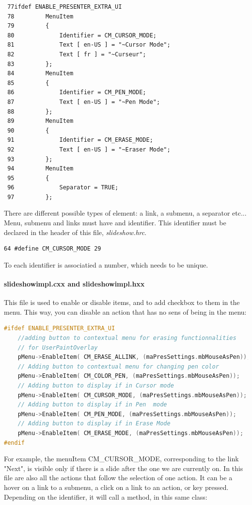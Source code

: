 \documentclass[a4paper,11pt]{article}
\begin{document}
\begin{verbatim}
 77ifdef ENABLE_PRESENTER_EXTRA_UI
 78         MenuItem
 79         {
 80             Identifier = CM_CURSOR_MODE;
 81             Text [ en-US ] = "~Cursor Mode";
 82             Text [ fr ] = "~Curseur";
 83         };
 84         MenuItem
 85         {
 86             Identifier = CM_PEN_MODE;
 87             Text [ en-US ] = "~Pen Mode";
 88         };
 89         MenuItem
 90         {
 91             Identifier = CM_ERASE_MODE;
 92             Text [ en-US ] = "~Eraser Mode";
 93         };
 94         MenuItem
 95         {
 96             Separator = TRUE;
 97         };
\end{verbatim}

    There are different possible types of element: a link, a submenu, a
separator etc... Menu, submenu and links must have and identifier. This
identifier must be declared in the header of this file, \emph{slideshow.hrc}.

\begin{verbatim}
64 #define CM_CURSOR_MODE 29
\end{verbatim}

To each identifier is associatied a number, which needs to be unique.

\paragraph*{slideshowimpl.cxx and slideshowimpl.hxx}

This file is used to enable or disable items, and to add checkbox to them in
the menu. This way, you can disable an action that has no sens of being in the
menu:

\begin{lstlisting}[language=C++]
#ifdef ENABLE_PRESENTER_EXTRA_UI
	//adding button to contextual menu for erasing functionnalities
	// for UserPaintOverlay
	pMenu->EnableItem( CM_ERASE_ALLINK, (maPresSettings.mbMouseAsPen));
	// Adding button to contextual menu for changing pen color
	pMenu->EnableItem( CM_COLOR_PEN, (maPresSettings.mbMouseAsPen));
	// Adding button to display if in Cursor mode
	pMenu->EnableItem( CM_CURSOR_MODE, (maPresSettings.mbMouseAsPen));
	// Adding button to display if in Pen  mode
	pMenu->EnableItem( CM_PEN_MODE, (maPresSettings.mbMouseAsPen));
	// Adding button to display if in Erase Mode
	pMenu->EnableItem( CM_ERASE_MODE, (maPresSettings.mbMouseAsPen));
#endif
\end{lstlisting}

For example, the menuItem CM\_CURSOR\_MODE, corresponding to the link "Next",
is visible only if there is a slide after the one we are currently on.  In
this file are also all the actions that follow the selection of one action. It
can be a hover on a link to a submenu, a click on a link to an action, or key
pressed. Depending on the identifier, it will call a method, in this same
class:
\end{document}
